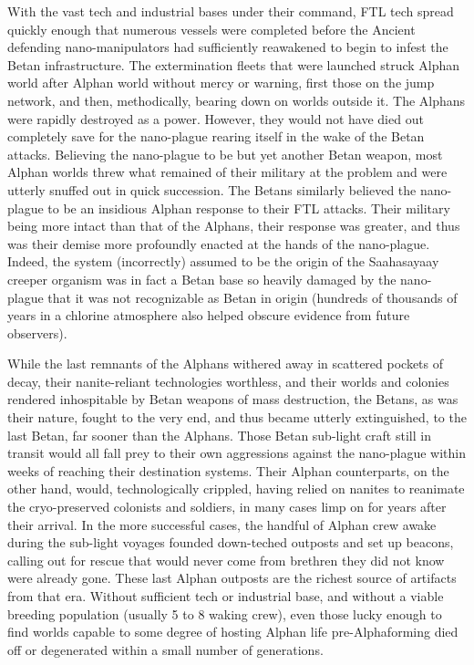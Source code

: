 With the vast tech and industrial bases under their command, FTL tech
spread quickly enough that numerous vessels were completed before the
Ancient defending nano-manipulators had sufficiently reawakened to
begin to infest the Betan infrastructure. The extermination fleets
that were launched struck Alphan world after Alphan world without
mercy or warning, first those on the jump network, and then,
methodically, bearing down on worlds outside it. The Alphans were
rapidly destroyed as a power. However, they would not have died out
completely save for the nano-plague rearing itself in the wake of the
Betan attacks. Believing the nano-plague to be but yet another Betan
weapon, most Alphan worlds threw what remained of their military at
the problem and were utterly snuffed out in quick succession. The
Betans similarly believed the nano-plague to be an insidious Alphan
response to their FTL attacks. Their military being more intact than
that of the Alphans, their response was greater, and thus was their
demise more profoundly enacted at the hands of the
nano-plague. Indeed, the system (incorrectly) assumed to be the origin
of the Saahasayaay creeper organism was in fact a Betan base so
heavily damaged by the nano-plague that it was not recognizable as
Betan in origin (hundreds of thousands of years in a chlorine
atmosphere also helped obscure evidence from future observers).

While the last remnants of the Alphans withered away in scattered
pockets of decay, their nanite-reliant technologies worthless, and
their worlds and colonies rendered inhospitable by Betan weapons of
mass destruction, the Betans, as was their nature, fought to the very
end, and thus became utterly extinguished, to the last Betan, far
sooner than the Alphans. Those Betan sub-light craft still in transit
would all fall prey to their own aggressions against the nano-plague
within weeks of reaching their destination systems. Their Alphan
counterparts, on the other hand, would, technologically crippled,
having relied on nanites to reanimate the cryo-preserved colonists and
soldiers, in many cases limp on for years after their arrival. In the
more successful cases, the handful of Alphan crew awake during the
sub-light voyages founded down-teched outposts and set up beacons,
calling out for rescue that would never come from brethren they did
not know were already gone. These last Alphan outposts are the richest
source of artifacts from that era. Without sufficient tech or
industrial base, and without a viable breeding population (usually 5
to 8 waking crew), even those lucky enough to find worlds capable to
some degree of hosting Alphan life pre-Alphaforming died off or
degenerated within a small number of generations.


